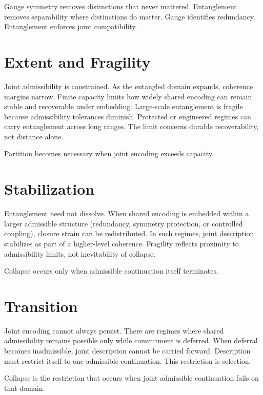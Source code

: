 \documentclass[11pt,twoside,openright]{book}
\begin{document}
Gauge symmetry removes distinctions that never mattered. Entanglement removes separability where distinctions do matter. Gauge identifies redundancy. Entanglement enforces joint compatibility.

\section*{Extent and Fragility}

Joint admissibility is constrained. As the entangled domain expands, coherence margins narrow. Finite capacity limits how widely shared encoding can remain stable and recoverable under embedding. Large-scale entanglement is fragile because admissibility tolerances diminish. Protected or engineered regimes can carry entanglement across long ranges. The limit concerns durable recoverability, not distance alone.

Partition becomes necessary when joint encoding exceeds capacity.

\section*{Stabilization}

Entanglement need not dissolve. When shared encoding is embedded within a larger admissible structure (redundancy, symmetry protection, or controlled coupling), closure strain can be redistributed. In such regimes, joint description stabilizes as part of a higher-level coherence. Fragility reflects proximity to admissibility limits, not inevitability of collapse.

Collapse occurs only when admissible continuation itself terminates.

\section*{Transition}

Joint encoding cannot always persist. There are regimes where shared admissibility remains possible only while commitment is deferred. When deferral becomes inadmissible, joint description cannot be carried forward. Description must restrict itself to one admissible continuation. This restriction is selection.

Collapse is the restriction that occurs when joint admissible continuation fails on that domain.
\end{document}
